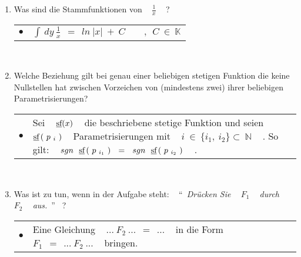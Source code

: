 \begin{enumerate}
	
	\item Was sind die Stammfunktionen von ~ $\frac{1}{x}$ ~ ? \\
	
	\begin{tabularx}{0.88\textwidth}{lX}
		$\bullet$ & $\int ~ dy ~ \frac{1}{x} ~~ = ~~ ln ~ \left| x \right| ~ + ~ C \qquad, ~~ C ~ \in ~ \mathbb{K}$
	\end{tabularx}
	
	~\\
	
	\item Welche Beziehung gilt bei genau einer beliebigen stetigen Funktion die keine Nullstellen hat zwischen Vorzeichen von (mindestens zwei) ihrer beliebigen Parametrisierungen? \\
	
	\begin{tabularx}{0.88\textwidth}{lX}
		$\bullet$ & Sei ~ $\text{\underline{sf}}(x)$ ~ die beschriebene stetige Funktion und seien ~ $\text{\underline{sf}}\left(~ p_{~ i} ~\right)$ ~ Parametrisierungen mit ~ $i ~ \in ~ \{ i_1, ~ i_2 \} \subset ~ \mathbb{N}$ ~ . So gilt: \newline\newline ~ $sgn ~~ \text{\underline{sf}}\left(~ p_{~ i_1} ~\right) ~~ = ~~ sgn ~~ \text{\underline{sf}}\left(~ p_{~ i_2} ~\right)$ ~ .
	\end{tabularx}
	
	~\\
	
	\item Was ist zu tun, wenn in der Aufgabe steht: ~ \textquotedblleft~\textit{Drücken Sie ~ $F_1$ ~ durch ~ $F_2$ ~ aus.}~\textquotedblright ~ ? \\
	
	\begin{tabularx}{0.88\textwidth}{lX}
		$\bullet$ & Eine Gleichung ~ $... ~ F_2 ~ ... ~~ = ~~ ...$ ~ in die Form ~ $F_1 ~~ = ~~ ... ~ F_2 ~ ...$ ~ bringen.
	\end{tabularx}
	
%	
%	
	

\end{enumerate}
